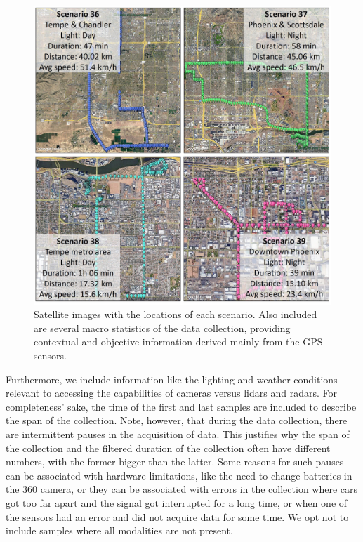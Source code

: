 \documentclass[10pt,comsoc]{IEEEtran}
\begin{document}
\begin{figure}[t]
	\centering
    \includegraphics[width=1\columnwidth]{macro_stats4}
	\caption{Satellite images with the locations of each scenario. Also included are several macro statistics of the data collection, providing contextual and objective information derived mainly from the GPS sensors.}
	\label{fig:locs}
\end{figure}

Furthermore, we include information like the lighting and weather conditions relevant to accessing the capabilities of cameras versus lidars and radars. For completeness' sake, the time of the first and last samples are included to describe the span of the collection. Note, however, that during the data collection, there are intermittent pauses in the acquisition of data. This justifies why the span of the collection and the filtered duration of the collection often have different numbers, with the former bigger than the latter. Some reasons for such pauses can be associated with hardware limitations, like the need to change batteries in the 360 camera, or they can be associated with errors in the collection where cars got too far apart and the signal got interrupted for a long time, or when one of the sensors had an error and did not acquire data for some time. We opt not to include samples where all modalities are not present. 
\end{document}

